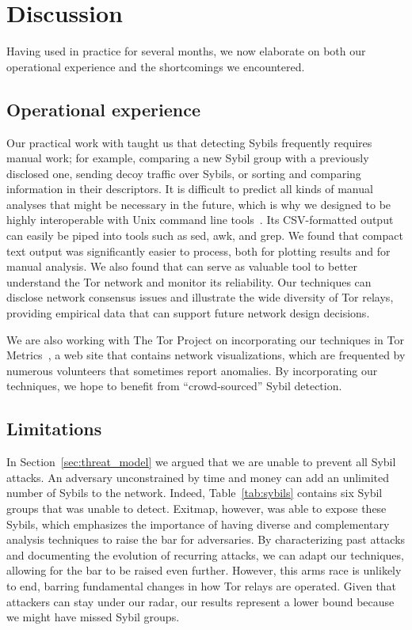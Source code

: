 \section{Discussion}
\label{sec:discussion}
Having used \sys in practice for several months, we now elaborate on both our
operational experience and the shortcomings we encountered.

\subsection{Operational experience}
\label{sec:operational}
Our practical work with \sys taught us that detecting Sybils frequently requires
manual work; for example, comparing a new Sybil group with a previously
disclosed one, sending decoy traffic over Sybils, or sorting and comparing
information in their descriptors.  It is difficult to predict all kinds of
manual analyses that might be necessary in the future, which is why we designed
\sys to be highly interoperable with Unix command line tools~\cite{Pike1983a}.
Its CSV-formatted output can easily be piped into tools such as sed, awk, and
grep.  We found that compact text output was significantly easier to process,
both for plotting results and for manual analysis.  We also found that \sys can
serve as valuable tool to better understand the Tor network and monitor its
reliability.  Our techniques can disclose network consensus issues and
illustrate the wide diversity of Tor relays, providing empirical data that can
support future network design decisions.

We are also working with The Tor Project on incorporating our techniques in
Tor Metrics~\cite{metrics}, a web site that contains network visualizations,
which are frequented by numerous volunteers that sometimes report anomalies.
By incorporating our techniques, we hope to benefit from ``crowd-sourced'' Sybil
detection.

\subsection{Limitations}
\label{sec:limitations}
In Section~\ref{sec:threat_model} we argued that we are unable to prevent all
Sybil attacks.  An adversary unconstrained by time and money can add an
unlimited number of Sybils to the network.  Indeed, Table~\ref{tab:sybils}
contains six Sybil groups that \sys was unable to detect.  Exitmap, however, was
able to expose these Sybils, which emphasizes the importance of having diverse
and complementary analysis techniques to raise the bar for adversaries.  By
characterizing past attacks and documenting the evolution of recurring attacks,
we can adapt our techniques, allowing for the bar to be raised even further.
However, this arms race is unlikely to end, barring fundamental changes in how
Tor relays are operated.  Given that attackers can stay under our radar, our
results represent a lower bound because we might have missed Sybil groups.

